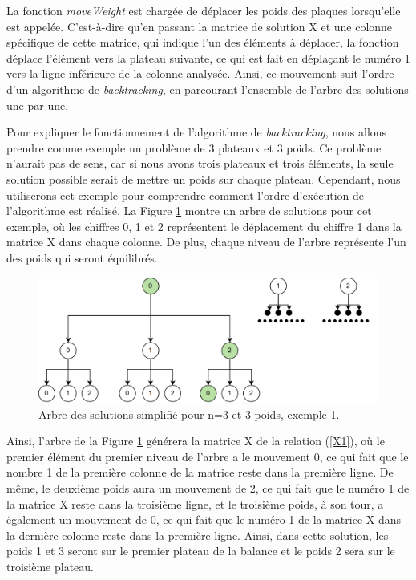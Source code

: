 \documentclass[12pt]{article} %
\begin{document}
\vfill

 La fonction \textit{moveWeight} est chargée de déplacer les poids des plaques lorsqu'elle est appelée. C'est-à-dire qu'en passant la matrice de solution X et une colonne spécifique de cette matrice, qui indique l'un des éléments à déplacer, la fonction déplace l'élément vers la plateau suivante, ce qui est fait en déplaçant le numéro 1 vers la ligne inférieure de la colonne analysée. Ainsi, ce mouvement suit l'ordre d'un algorithme de \textit{backtracking}, en parcourant l'ensemble de l'arbre des solutions une par une. 

 \vfill

 Pour expliquer le fonctionnement de l'algorithme de \textit{backtracking}, nous allons prendre comme exemple un problème de 3 plateaux et 3 poids. Ce problème n'aurait pas de sens, car si nous avons trois plateaux et trois éléments, la seule solution possible serait de mettre un poids sur chaque plateau. Cependant, nous utiliserons cet exemple pour comprendre comment l'ordre d'exécution de l'algorithme est réalisé. La Figure \ref{fig:backtracking1} montre un arbre de solutions pour cet exemple, où les chiffres 0, 1 et 2 représentent le déplacement du chiffre 1 dans la matrice X dans chaque colonne. De plus, chaque niveau de l'arbre représente l'un des poids qui seront équilibrés. 

\vfill

\FloatBarrier
\begin{figure}[!h]
\centering
\includegraphics[width = 0.66\linewidth]{diagram/backtracking1.png}
\caption{Arbre des solutions simplifié pour n=3 et 3 poids, exemple 1.}
\label{fig:backtracking1}
\end{figure}
\FloatBarrier

\vfill

Ainsi, l'arbre de la Figure \ref{fig:backtracking1} générera la matrice X de la relation (\ref{X1}), où le premier élément du premier niveau de l'arbre a le mouvement 0, ce qui fait que le nombre 1 de la première colonne de la matrice reste dans la première ligne. De même, le deuxième poids aura un mouvement de 2, ce qui fait que le numéro 1 de la matrice X reste dans la troisième ligne, et le troisième poids, à son tour, a également un mouvement de 0, ce qui fait que le numéro 1 de la matrice X dans la dernière colonne reste dans la première ligne. Ainsi, dans cette solution, les poids 1 et 3 seront sur le premier plateau de la balance et le poids 2 sera sur le troisième plateau.
\end{document}
